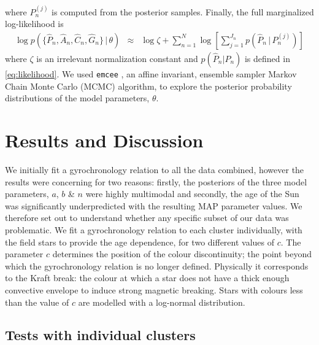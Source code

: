 \documentclass[10pt,preprint]{aastex}
\begin{document}
where $P_n^{(j)}$ is computed from the posterior samples.
Finally, the full marginalized log-likelihood is
\begin{eqnarray}
	\log p(\{\hat{P}_n,\hat{A}_n,\hat{C}_n,\hat{G}_n\}\,|\,\theta) &\approx&
    \log\zeta + \sum_{n=1}^N
        \log \left[ \sum_{j=1}^{J_n}p(\hat{P}_n\,|\,P_n^{(j)}) \right ]
\end{eqnarray}
where $\zeta$ is an irrelevant normalization constant and $p(\hat{P}_n|P_n)$ is defined in \ref{eq:likelihood}.
We used {\tt emcee} \citep{Foreman-Mackey2013}, an affine invariant, ensemble sampler Markov Chain Monte Carlo (MCMC) algorithm, to explore the posterior probability distributions of the model parameters, $\theta$.


\section{Results and Discussion}
\label{sec:results}

We initially fit a gyrochronology relation to all the data combined, however the results were concerning for two reasons:
firstly, the posteriors of the three model parameters, $a$, $b$ \& $n$ were highly multimodal and secondly, the age of the Sun was significantly underpredicted with the resulting MAP parameter values.
We therefore set out to understand whether any specific subset of our data was problematic.
We fit a gyrochronology relation to each cluster individually, with the field stars to provide the age dependence, for two different values of $c$.
The parameter $c$ determines the position of the colour discontinuity; the point beyond which the gyrochronology relation is no longer defined.
Physically it corresponds to the Kraft break: the colour at which a star does not have a thick enough convective envelope to induce strong magnetic breaking.
Stars with colours less than the value of $c$ are modelled with a log-normal distribution.

\subsection{Tests with individual clusters}
\end{document}
